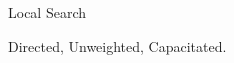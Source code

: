 \begin{frame}
\vfill
\begin{center}
\Huge 
Local Search

\vspace{1cm}

\huge
Directed, Unweighted, Capacitated.
\end{center}
\vfill
\end{frame}